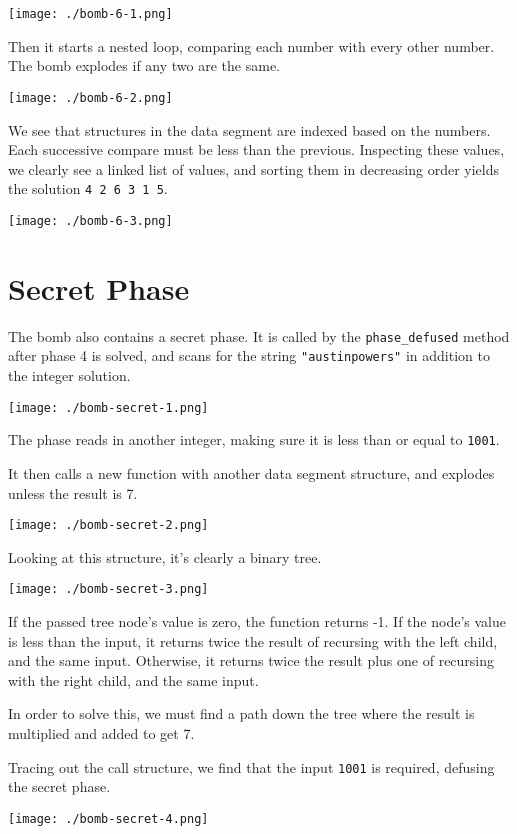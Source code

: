 \documentclass[11pt]{article}
\begin{document}
\begin{center}
\texttt{[image: ./bomb-6-1.png]}
\end{center}

Then it starts a nested loop, comparing each number with every other
number. The bomb explodes if any two are the same.

\begin{center}
\texttt{[image: ./bomb-6-2.png]}
\end{center}


We see that structures in the data segment are indexed based on the
numbers. Each successive compare must be less than the previous.
Inspecting these values, we clearly see a linked list of values, and
sorting them in decreasing order yields the solution \texttt{4 2 6 3 1 5}.

\begin{center}
\texttt{[image: ./bomb-6-3.png]}
\end{center}
\section{Secret Phase}
\label{sec:org4ed7edc}
The bomb also contains a secret phase. It is called by the
\texttt{phase\_defused} method after phase 4 is solved, and scans for the
string \texttt{"austinpowers"} in addition to the integer solution.

\begin{center}
\texttt{[image: ./bomb-secret-1.png]}
\end{center}

The phase reads in another integer, making sure it is less than or
equal to \texttt{1001}.

It then calls a new function with another data segment structure, and
explodes unless the result is 7.

\begin{center}
\texttt{[image: ./bomb-secret-2.png]}
\end{center}


Looking at this structure, it's clearly a binary tree.

\begin{center}
\texttt{[image: ./bomb-secret-3.png]}
\end{center}

If the passed tree node's value is zero, the function returns -1. If
the node's value is less than the input, it returns twice the result
of recursing with the left child, and the same input. Otherwise, it
returns twice the result plus one of recursing with the right child,
and the same input.

In order to solve this, we must find a path down the tree where the
result is multiplied and added to get 7.

Tracing out the call structure, we find that the input \texttt{1001} is
required, defusing the secret phase.

\begin{center}
\texttt{[image: ./bomb-secret-4.png]}
\end{center}
\end{document}

